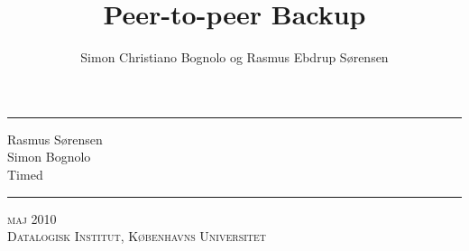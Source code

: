 

\title{Peer-to-peer Backup}
\author{Simon Christiano Bognolo og Rasmus Ebdrup Sørensen}


\begin{titlingpage}
\newcommand{\HRule}{\rule{\linewidth}{1mm}}
\noindent\HRule
\begin{flushright}
                \large 
                Rasmus Sørensen\\
                Simon Bognolo
                \\[5mm]
            \huge Timed \pycsp
\end{flushright}                
\HRule
{}
\begin{center}
\large\textsc{maj 2010}\\
\large\textsc{Datalogisk Institut, Københavns Universitet}
\end{center}
\end{titlingpage}

\frontmatter
%
\tableofcontents



%
\mainmatter
\linespread{1.5}
\selectfont 





 


\linespread{1}
\printbibliography



